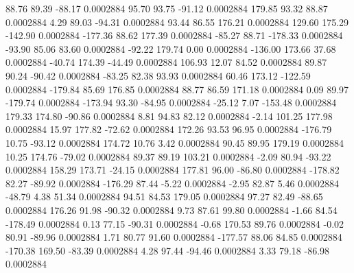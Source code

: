        88.76       89.39      -88.17     0.0002884
       95.70       93.75      -91.12     0.0002884
      179.85       93.32       88.87     0.0002884
        4.29       89.03      -94.31     0.0002884
       93.44       86.55      176.21     0.0002884
      129.60      175.29     -142.90     0.0002884
     -177.36       88.62      177.39     0.0002884
      -85.27       88.71     -178.33     0.0002884
      -93.90       85.06       83.60     0.0002884
      -92.22      179.74        0.00     0.0002884
     -136.00      173.66       37.68     0.0002884
      -40.74      174.39      -44.49     0.0002884
      106.93       12.07       84.52     0.0002884
       89.87       90.24      -90.42     0.0002884
      -83.25       82.38       93.93     0.0002884
       60.46      173.12     -122.59     0.0002884
     -179.84       85.69      176.85     0.0002884
       88.77       86.59      171.18     0.0002884
        0.09       89.97     -179.74     0.0002884
     -173.94       93.30      -84.95     0.0002884
      -25.12        7.07     -153.48     0.0002884
      179.33      174.80      -90.86     0.0002884
        8.81       94.83       82.12     0.0002884
       -2.14      101.25      177.98     0.0002884
       15.97      177.82      -72.62     0.0002884
      172.26       93.53       96.95     0.0002884
     -176.79       10.75      -93.12     0.0002884
      174.72       10.76        3.42     0.0002884
       90.45       89.95      179.19     0.0002884
       10.25      174.76      -79.02     0.0002884
       89.37       89.19      103.21     0.0002884
       -2.09       80.94      -93.22     0.0002884
      158.29      173.71      -24.15     0.0002884
      177.81       96.00      -86.80     0.0002884
     -178.82       82.27      -89.92     0.0002884
     -176.29       87.44       -5.22     0.0002884
       -2.95       82.87        5.46     0.0002884
      -48.79        4.38       51.34     0.0002884
       94.51       84.53      179.05     0.0002884
       97.27       82.49      -88.65     0.0002884
      176.26       91.98      -90.32     0.0002884
        9.73       87.61       99.80     0.0002884
       -1.66       84.54     -178.49     0.0002884
        0.13       77.15      -90.31     0.0002884
       -0.68      170.53       89.76     0.0002884
       -0.02       80.91      -89.96     0.0002884
        1.71       80.77       91.60     0.0002884
     -177.57       88.06       84.85     0.0002884
     -170.38      169.50      -83.39     0.0002884
        4.28       97.44      -94.46     0.0002884
        3.33       79.18      -86.98     0.0002884
